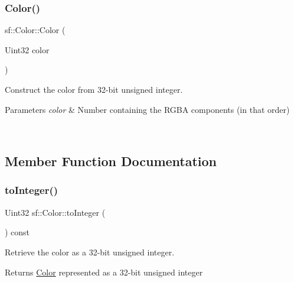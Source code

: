 \subsubsection{\texorpdfstring{Color()}{Color()}\hspace{0.1cm}{\footnotesize\ttfamily [3/3]}}
{\footnotesize\ttfamily sf\+::\+Color\+::\+Color (\begin{DoxyParamCaption}\item[{Uint32}]{color }\end{DoxyParamCaption})\hspace{0.3cm}{\ttfamily [explicit]}}



Construct the color from 32-\/bit unsigned integer. 


\begin{DoxyParams}{Parameters}
{\em color} & Number containing the R\+G\+BA components (in that order) \begin{DoxyVerb}\end{DoxyVerb}
 \\
\hline
\end{DoxyParams}


\subsection{Member Function Documentation}
\mbox{\label{classsf_1_1_color_abb46e6942c4fe0d221574a46e642caa9}} 
\subsubsection{\texorpdfstring{toInteger()}{toInteger()}}
{\footnotesize\ttfamily Uint32 sf\+::\+Color\+::to\+Integer (\begin{DoxyParamCaption}{ }\end{DoxyParamCaption}) const}



Retrieve the color as a 32-\/bit unsigned integer. 

\begin{DoxyReturn}{Returns}
\mbox{\hyperlink{classsf_1_1_color}{Color}} represented as a 32-\/bit unsigned integer \begin{DoxyVerb}\end{DoxyVerb}
 
\end{DoxyReturn}


